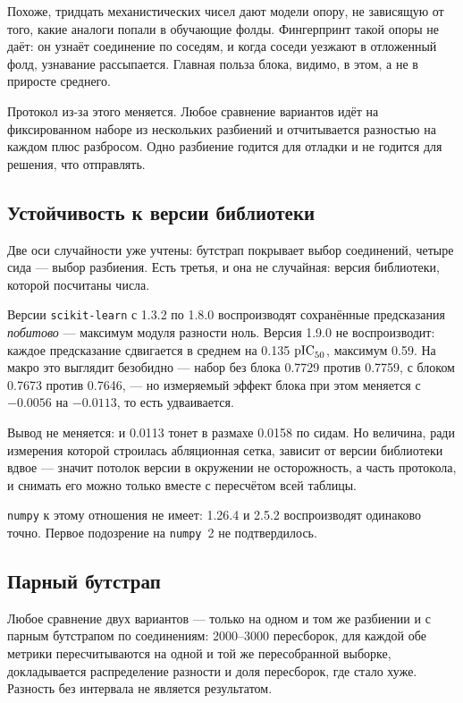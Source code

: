 Похоже, тридцать механистических чисел дают модели опору, не зависящую от того, какие аналоги
попали в обучающие фолды. Фингерпринт такой опоры не даёт: он узнаёт соединение по соседям, и когда
соседи уезжают в отложенный фолд, узнавание рассыпается. Главная польза блока, видимо, в этом,
а не в приросте среднего.

Протокол из-за этого меняется. Любое сравнение вариантов идёт на фиксированном наборе из нескольких
разбиений и отчитывается разностью на каждом плюс разбросом. Одно разбиение годится для отладки
и не годится для решения, что отправлять.

\subsection{Устойчивость к версии библиотеки}

Две оси случайности уже учтены: бутстрап покрывает выбор соединений, четыре сида --- выбор
разбиения. Есть третья, и она не случайная: версия библиотеки, которой посчитаны числа.

Версии \texttt{scikit-learn} с 1.3.2 по 1.8.0 воспроизводят сохранённые предсказания
\emph{побитово} --- максимум модуля разности ноль. Версия 1.9.0 не воспроизводит: каждое
предсказание сдвигается в среднем на 0.135 $\mathrm{pIC}_{50}$, максимум 0.59. На макро это выглядит
безобидно --- набор без блока 0.7729 против 0.7759, с блоком 0.7673 против 0.7646, --- но
измеряемый эффект блока при этом меняется с $-0.0056$ на $-0.0113$, то есть удваивается.

Вывод не меняется: и 0.0113 тонет в размахе 0.0158 по сидам. Но величина, ради измерения
которой строилась абляционная сетка, зависит от версии библиотеки вдвое --- значит потолок
версии в окружении не осторожность, а часть протокола, и снимать его можно только вместе
с пересчётом всей таблицы.

\texttt{numpy} к этому отношения не имеет: 1.26.4 и 2.5.2 воспроизводят одинаково точно.
Первое подозрение на \texttt{numpy}~2 не подтвердилось.

\subsection{Парный бутстрап}

Любое сравнение двух вариантов --- только на одном и том же разбиении и с парным бутстрапом
по соединениям: 2000--3000 пересборок, для каждой обе метрики пересчитываются на одной и той же
пересобранной выборке, докладывается распределение разности и доля пересборок, где стало хуже.
Разность без интервала не является результатом.


